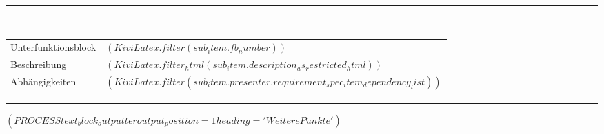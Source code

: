\documentclass{scrartcl}
\begin{document}
\hspace*{1.15cm}\rule{15.2cm}{0.2pt}\\
\hspace*{1.0cm}%
\parbox[t]{15.0cm}{%
\begin{longtable}{p{2.8cm}p{11.7cm}}
  Unterfunktionsblock & $( KiviLatex.filter(sub_item.fb_number) )$\\
  Beschreibung & $( KiviLatex.filter_html(sub_item.description_as_restricted_html) )$\\
  Abhängigkeiten & $( KiviLatex.filter(sub_item.presenter.requirement_spec_item_dependency_list) )$
\end{longtable}}


\vspace{0.2cm}
\hrule
\vspace{0.4cm}


%

$( PROCESS text_block_outputter output_position=1 heading='Weitere Punkte' )$
\end{document}
